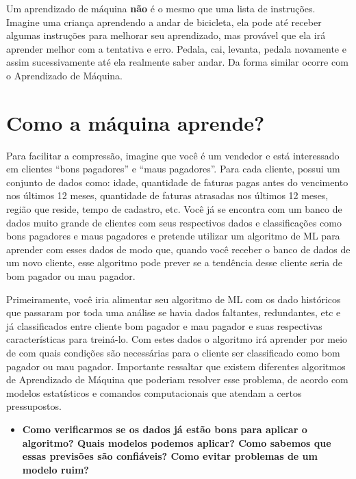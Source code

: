 \documentclass[
]{book}
\providecommand{\tightlist}{%
  \setlength{\itemsep}{0pt}\setlength{\parskip}{0pt}}
\begin{document}
Um aprendizado de máquina \textbf{não} é o mesmo que uma lista de instruções. Imagine uma criança aprendendo a andar de bicicleta, ela pode até receber algumas instruções para melhorar seu aprendizado, mas provável que ela irá aprender melhor com a tentativa e erro. Pedala, cai, levanta, pedala novamente e assim sucessivamente até ela realmente saber andar. Da forma similar ocorre com o Aprendizado de Máquina.

\hypertarget{como-a-muxe1quina-aprende}{%
\section{Como a máquina aprende?}\label{como-a-muxe1quina-aprende}}

Para facilitar a compressão, imagine que você é um vendedor e está interessado em clientes ``bons pagadores'' e ``maus pagadores''. Para cada cliente, possui um conjunto de dados como: idade, quantidade de faturas pagas antes do vencimento nos últimos 12 meses, quantidade de faturas atrasadas nos últimos 12 meses, região que reside, tempo de cadastro, etc. Você já se encontra com um banco de dados muito grande de clientes com seus respectivos dados e classificações como bons pagadores e maus pagadores e pretende utilizar um algoritmo de ML para aprender com esses dados de modo que, quando você receber o banco de dados de um novo cliente, esse algoritmo pode prever se a tendência desse cliente seria de bom pagador ou mau pagador.

Primeiramente, você iria alimentar seu algoritmo de ML com os dado históricos que passaram por toda uma análise se havia dados faltantes, redundantes, etc e já classificados entre cliente bom pagador e mau pagador e suas respectivas características para treiná-lo. Com estes dados o algoritmo irá aprender por meio de com quais condições são necessárias para o cliente ser classificado como bom pagador ou mau pagador. Importante ressaltar que existem diferentes algoritmos de Aprendizado de Máquina que poderiam resolver esse problema, de acordo com modelos estatísticos e comandos computacionais que atendam a certos pressupostos.

\begin{itemize}
\tightlist
\item
  \textbf{Como verificarmos se os dados já estão bons para aplicar o algoritmo? Quais modelos podemos aplicar? Como sabemos que essas previsões são confiáveis? Como evitar problemas de um modelo ruim?}
\end{itemize}
\end{document}
